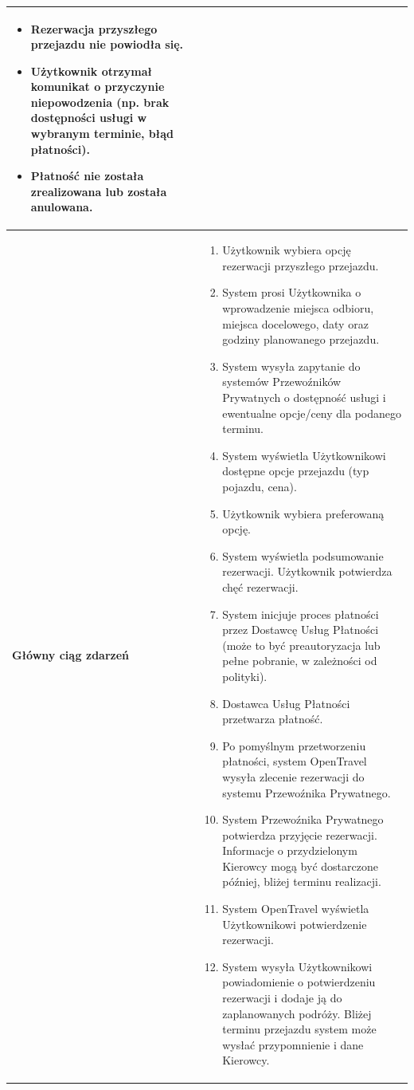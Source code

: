 \documentclass[a4paper,12pt]{article}
\begin{document}
\begin{longtable}{|p{\pierwszakolumnaszerokoscPUTPTRezPrzyszla}|p{\drugakolumnaszerokoscPUTPTRezPrzyszla}|}
\begin{itemize}
            \item Rezerwacja przyszłego przejazdu nie powiodła się.
            \item Użytkownik otrzymał komunikat o przyczynie niepowodzenia (np. brak dostępności usługi w wybranym terminie, błąd płatności).
            \item Płatność nie została zrealizowana lub została anulowana.
        \end{itemize} \\
    \hline
    \textbf{Główny ciąg zdarzeń} &
        \begin{enumerate} \itemsep0pt \parskip0pt \parsep0pt
            \item Użytkownik wybiera opcję rezerwacji przyszłego przejazdu.
            \item System prosi Użytkownika o wprowadzenie miejsca odbioru, miejsca docelowego, daty oraz godziny planowanego przejazdu.
            \item System wysyła zapytanie do systemów Przewoźników Prywatnych o dostępność usługi i ewentualne opcje/ceny dla podanego terminu.
            \item System wyświetla Użytkownikowi dostępne opcje przejazdu (typ pojazdu, cena).
            \item Użytkownik wybiera preferowaną opcję.
            \item System wyświetla podsumowanie rezerwacji. Użytkownik potwierdza chęć rezerwacji.
            \item System inicjuje proces płatności przez Dostawcę Usług Płatności (może to być preautoryzacja lub pełne pobranie, w zależności od polityki).
            \item Dostawca Usług Płatności przetwarza płatność.
            \item Po pomyślnym przetworzeniu płatności, system OpenTravel wysyła zlecenie rezerwacji do systemu Przewoźnika Prywatnego.
            \item System Przewoźnika Prywatnego potwierdza przyjęcie rezerwacji. Informacje o przydzielonym Kierowcy mogą być dostarczone później, bliżej terminu realizacji.
            \item System OpenTravel wyświetla Użytkownikowi potwierdzenie rezerwacji.
            \item System wysyła Użytkownikowi powiadomienie o potwierdzeniu rezerwacji i dodaje ją do zaplanowanych podróży. Bliżej terminu przejazdu system może wysłać przypomnienie i dane Kierowcy.
        \end{enumerate} \\

\end{longtable}
\end{document}
